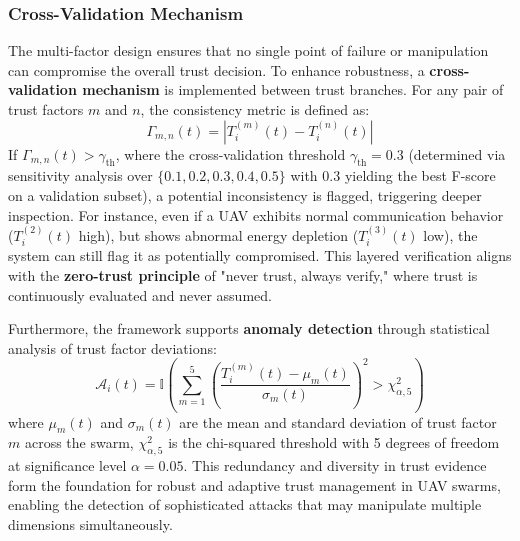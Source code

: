 \documentclass[notspecified,article,submit,moreauthors]{Definitions/mdpi}
\begin{document}
\subsubsection{Cross-Validation Mechanism}
The multi-factor design ensures that no single point of failure or manipulation can compromise the overall trust decision. To enhance robustness, a \textbf{cross-validation mechanism} is implemented between trust branches. For any pair of trust factors $m$ and $n$, the consistency metric is defined as:
\begin{equation}\label{eq:consistency}
\Gamma_{m,n}(t) = \left| T_i^{(m)}(t) - T_i^{(n)}(t) \right|
\end{equation}
If $\Gamma_{m,n}(t) > \gamma_{\text{th}}$, where the cross-validation threshold $\gamma_{\text{th}} = 0.3$ (determined via sensitivity analysis over $\{0.1, 0.2, 0.3, 0.4, 0.5\}$ with $0.3$ yielding the best F-score on a validation subset), a potential inconsistency is flagged, triggering deeper inspection. For instance, even if a UAV exhibits normal communication behavior ($T_i^{(2)}(t)$ high), but shows abnormal energy depletion ($T_i^{(3)}(t)$ low), the system can still flag it as potentially compromised. This layered verification aligns with the \textbf{zero-trust principle} of "never trust, always verify," where trust is continuously evaluated and never assumed.

Furthermore, the framework supports \textbf{anomaly detection} through statistical analysis of trust factor deviations:
\begin{equation}\label{eq:anomaly}
\mathcal{A}_i(t) = \mathbb{I}\left( \sum_{m=1}^{5} \left( \frac{T_i^{(m)}(t) - \mu_m(t)}{\sigma_m(t)} \right)^2 > \chi^2_{\alpha,5} \right)
\end{equation}
where $\mu_m(t)$ and $\sigma_m(t)$ are the mean and standard deviation of trust factor $m$ across the swarm, $\chi^2_{\alpha,5}$ is the chi-squared threshold with 5 degrees of freedom at significance level $\alpha = 0.05$. This redundancy and diversity in trust evidence form the foundation for robust and adaptive trust management in UAV swarms, enabling the detection of sophisticated attacks that may manipulate multiple dimensions simultaneously.
\end{document}

